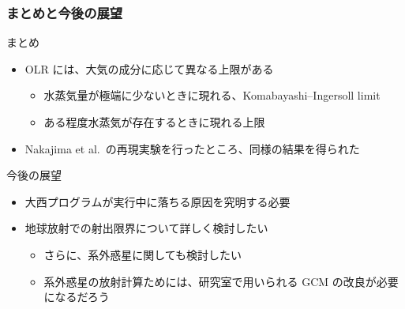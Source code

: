\documentclass[aspectratio=149]{beamer}
\begin{document}
\begin{frame}
	\frametitle{まとめと今後の展望}
	\begin{block}{まとめ}
		\begin{itemize}
			\item OLR には、大気の成分に応じて異なる上限がある
				\begin{itemize}
					\item 水蒸気量が極端に少ないときに現れる、Komabayashi--Ingersoll limit
					\item ある程度水蒸気が存在するときに現れる上限
				\end{itemize}
			\item Nakajima et al.\ の再現実験を行ったところ、同様の結果を得られた
		\end{itemize}
	\end{block}
	\begin{block}{今後の展望}
		\begin{itemize}
			\item 大西プログラムが実行中に落ちる原因を究明する必要
			\item 地球放射での射出限界について詳しく検討したい
				\begin{itemize}
					\item さらに、系外惑星に関しても検討したい
					\item 系外惑星の放射計算ためには、研究室で用いられる
						GCM の改良が必要になるだろう
				\end{itemize}
		\end{itemize}
	\end{block}
\end{frame}
\end{document}
